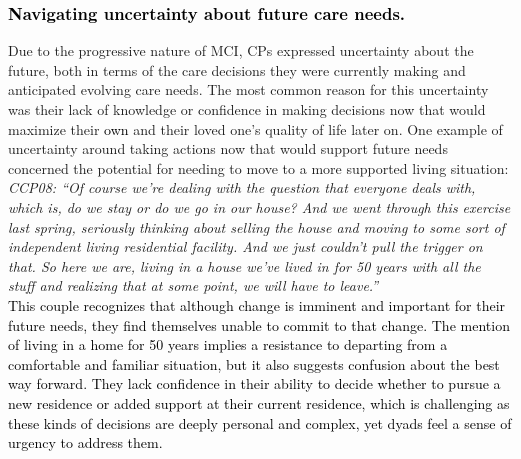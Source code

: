 \documentclass[acmsmall]{acmart}
\begin{document}
\subsubsection{\textcolor{black}{Navigating uncertainty about future care needs.}}

Due to the progressive nature of MCI, CPs expressed uncertainty about the future, both in terms of the care decisions they were currently making and anticipated evolving care needs. The most common reason for this uncertainty was their lack of knowledge or confidence in making decisions now that would maximize their \textcolor{black}{own} and their loved one’s quality of life later on. One example of uncertainty around taking actions now that would support future needs concerned the potential for needing to move to a more supported living situation:
\\

\textit{CCP08: “Of course we’re dealing with the question that everyone deals with, which is, do we stay or do we go in our house? And we went through this exercise last spring, seriously thinking about selling the house and moving to some sort of independent living residential facility. And we just couldn’t pull the trigger on that. So here we are, living in a house we’ve lived in for 50 years with all the stuff and realizing that at some point, we will have to leave.”}
\\

\textcolor{black}{This couple recognizes that although change is imminent and important for their future needs, they find themselves unable to commit to that change. The mention of living in a home for 50 years implies a resistance to departing from a comfortable and familiar situation, but it also suggests confusion about the best way forward. They lack confidence in their ability to decide whether to pursue a new residence or added support at their current residence, which is challenging as these kinds of decisions are deeply personal and complex, yet dyads feel a sense of urgency to address them.}
\end{document}
